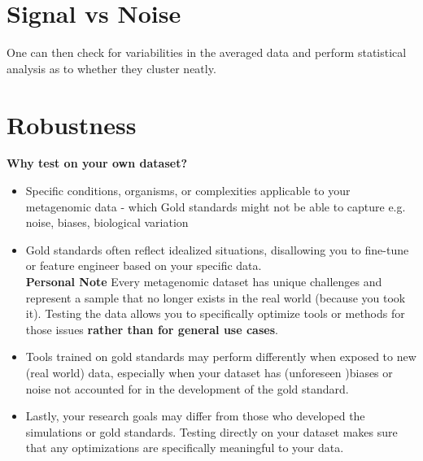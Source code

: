 \documentclass[11pt]{report}
\begin{document}
{\begin{tcolorbox}[label=box:Coalescent, colback=gray!10!white, coltitle=white, colframe=gray!80!black, title=Coalescent, breakable]
\end{tcolorbox}
	
	
\begin{tcolorbox}[label=box:Network Phylogenetics, colback=gray!10!white, coltitle=white, colframe=gray!80!black, title=Networks in Phylogenetics, breakable]
\end{tcolorbox}

\section{Signal vs Noise}
\begin{tcolorbox}[label=box:signal_averaging, colback=gray!10!white, coltitle=white, colframe=gray!80!black, title=Signal Averaging, breakable]
	
	
	One can then check for variabilities in the averaged data and perform statistical analysis as to whether they cluster neatly. 
	
\end{tcolorbox}


\section{Robustness}
\begin{tcolorbox}[label=box:Benchmarking, colback=gray!10!white, coltitle=white, colframe=gray!80!black, title=Benchmarking, breakable]




\textbf{Why test on your own dataset?}
\begin{itemize}
	\item Specific conditions, organisms, or complexities applicable to your metagenomic data - which Gold standards might not be able to capture e.g. noise, biases, biological variation
	\item Gold standards often reflect idealized situations, disallowing you to fine-tune or feature engineer based on your specific data.\\
	\textbf{Personal Note} Every metagenomic dataset has unique challenges and represent a sample that no longer exists in the real world (because you took it). Testing the data allows you to specifically optimize tools or methods for those issues \textbf{rather than for general use cases}.
	\item Tools trained on gold standards may perform differently when exposed to new (real world) data, especially when your dataset has (unforeseen )biases or noise not accounted for in the development of the gold standard. 
	\item Lastly, your research goals may differ from those who developed the simulations or gold standards. Testing directly on your dataset makes sure that any optimizations are specifically meaningful to your data.
\end{itemize}	
	

\end{tcolorbox}}
\end{document}
